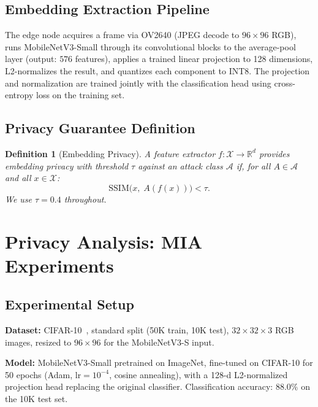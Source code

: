 \documentclass[journal]{IEEEtran}
\newtheorem{definition}{Definition}
\newcommand{\ssim}{\mathrm{SSIM}}
\newcommand{\MN}{MobileNetV3-S\xspace}
\begin{document}
\subsection{Embedding Extraction Pipeline}

The edge node acquires a frame via OV2640 (JPEG decode to
$96 \times 96$ RGB), runs MobileNetV3-Small through its convolutional
blocks to the average-pool layer (output: $576$ features), applies a
trained linear projection to 128 dimensions, L2-normalizes the result,
and quantizes each component to INT8.
The projection and normalization are trained jointly with the
classification head using cross-entropy loss on the training set.

\subsection{Privacy Guarantee Definition}

\begin{definition}[Embedding Privacy]
\label{def:embprivacy}
A feature extractor $f : \mathcal{X} \to \mathbb{R}^d$ provides
\emph{embedding privacy} with threshold $\tau$ against an attack class
$\mathcal{A}$ if, for all $A \in \mathcal{A}$ and all $x \in \mathcal{X}$:
\[
  \ssim\!\bigl(x,\; A(f(x))\bigr) < \tau.
\]
We use $\tau = 0.4$ throughout.
\end{definition}

\section{Privacy Analysis: MIA Experiments}
\label{sec:mia}

\subsection{Experimental Setup}

\textbf{Dataset:} CIFAR-10~\cite{Krizhevsky2009}, standard split
(50K train, 10K test), $32 \times 32 \times 3$ RGB images,
resized to $96 \times 96$ for the \MN input.

\textbf{Model:} MobileNetV3-Small pretrained on ImageNet,
fine-tuned on CIFAR-10 for 50 epochs (Adam, lr$=10^{-4}$,
cosine annealing), with a 128-d L2-normalized projection head
replacing the original classifier.
Classification accuracy: $88.0\%$ on the 10K test set.
\end{document}
